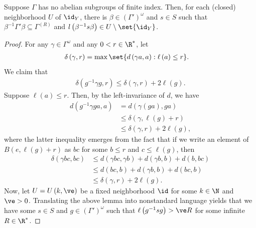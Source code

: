 \documentclass[10pt]{mypackage}
\begin{document}
\begin{proposition}
  Suppose $\Gamma$ has no abelian subgroups of finite index. Then, for each (closed) neighborhood $U$ of $\id_Y$, there is $\beta\in \left( \Gamma' \right)^{\omega}$ and $s\in S$ such that $\beta^{-1}\Gamma'\beta\subseteq \Gamma^{(R)}$ and $l\left( \beta^{-1}s\beta \right)\in U\setminus \set{\id_Y}$.
\end{proposition}
\begin{proof}
  For any $\gamma\in \Gamma^{\omega}$ and any $0 < r\in \R^{\ast}$, let
  \begin{align*}
    \delta\left( \gamma,r \right) &= \max\set{d\left( \gamma a,a \right) : \ell\left( a \right) \leq r}.
  \end{align*}
  We claim that
  \begin{align*}
    \delta\left( g^{-1}\gamma g,r \right) \leq \delta\left( \gamma,r \right) + 2\ell\left( g \right).
  \end{align*}
  Suppose $\ell\left( a \right)\leq r$. Then, by the left-invariance of $d$, we have
  \begin{align*}
    d\left( g^{-1}\gamma g a,a \right) &= d\left( \gamma\left( ga \right),ga \right)\\
                                       &\leq \delta\left( \gamma,\ell\left( g \right) + r \right)\\
                                       &\leq \delta\left( \gamma,r \right) + 2\ell\left( g \right),
  \end{align*}
  where the latter inequality emerges from the fact that if we write an element of $B\left( e,\ell\left( g \right) + r \right)$ as $bc$ for some $b\leq r$ and $c\leq \ell\left( g \right)$, then
  \begin{align*}
    \delta\left( \gamma bc,bc \right) &\leq d\left( \gamma bc,\gamma b \right) + d\left( \gamma b,b \right) + d\left( b,bc \right)\\
                                      &\leq d\left( bc,b \right) + d\left( \gamma b,b \right) + d\left( bc,b \right)\\
                                      &\leq \delta\left( \gamma,r \right) + 2\ell\left( g \right).
  \end{align*}
  Now, let $U = U\left( k,\ve \right)$ be a fixed neighborhood $\id$ for some $k\in \N$ and $\ve > 0$. Translating the above lemma into nonstandard language yields that we have some $s\in S$ and $g\in \left( \Gamma' \right)^{\omega}$ such that $\ell\left( g^{-1}sg \right) > \ve R$ for some infinite $R\in \R^{\ast}$.


\end{proof}
\end{document}

